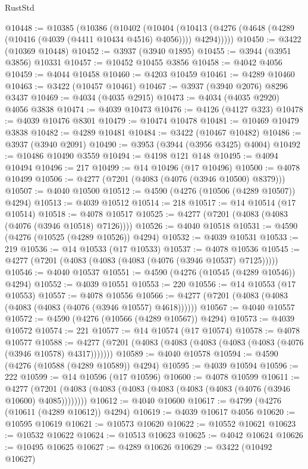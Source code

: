 \begin{lexlean}{RustStd}
\begin{coremodule}
@10448 := @10385
    (@10386
      (@10402
        (@10404
          (@10413 (@4276 (@4648 (@4289 (@10416 (@4039 (@4411 @10434 @4516) @4056)))) @4294)))))
@10450 := @3422 (@10369 @10448)
@10452 := @3937 (@3940 @1895)
@10455 := @3944 (@3951 @3856) @10331
@10457 := @10452 @10455 @3856
@10458 := @4042 @4056
@10459 := @4044 @10458
@10460 := @4203 @10459
@10461 := @4289 @10460
@10463 := @3422 (@10457 @10461)
@10467 := @3937 (@3940 @2076) @8296 @3437
@10469 := @4034 (@4035 @2915)
@10473 := @4034 (@4035 @2920) @4056 @3838
@10474 := @4039 @10473
@10476 := @4126 (@4127 @323)
@10478 := @4039 @10476 @8301
@10479 := @10474 @10478
@10481 := @10469 @10479 @3838
@10482 := @4289 @10481
@10484 := @3422 (@10467 @10482)
@10486 := @3937 (@3940 @2091)
@10490 := @3953 (@3944 (@3956 @3425) @4004)
@10492 := @10486 @10490 @3559
@10494 := @4198 @121 @148
@10495 := @4094 @10494
@10496 := 217
@10499 := @14 @10496 (@17 @10496)
@10500 := @4078 @10499
@10506 := @4277 (@7201 (@4083 (@4076 (@3946 @10500) @8379)))
@10507 := @4040 @10500
@10512 := @4590 (@4276 (@10506 (@4289 @10507)) @4294)
@10513 := @4039 @10512
@10514 := 218
@10517 := @14 @10514 (@17 @10514)
@10518 := @4078 @10517
@10525 := @4277 (@7201 (@4083 (@4083 (@4076 (@3946 @10518) @7126))))
@10526 := @4040 @10518
@10531 := @4590 (@4276 (@10525 (@4289 @10526)) @4294)
@10532 := @4039 @10531
@10533 := 219
@10536 := @14 @10533 (@17 @10533)
@10537 := @4078 @10536
@10545 := @4277 (@7201 (@4083 (@4083 (@4083 (@4076 (@3946 @10537) @7125)))))
@10546 := @4040 @10537
@10551 := @4590 (@4276 (@10545 (@4289 @10546)) @4294)
@10552 := @4039 @10551
@10553 := 220
@10556 := @14 @10553 (@17 @10553)
@10557 := @4078 @10556
@10566 := @4277 (@7201 (@4083 (@4083 (@4083 (@4083 (@4076 (@3946 @10557) @4618))))))
@10567 := @4040 @10557
@10572 := @4590 (@4276 (@10566 (@4289 @10567)) @4294)
@10573 := @4039 @10572
@10574 := 221
@10577 := @14 @10574 (@17 @10574)
@10578 := @4078 @10577
@10588 := @4277 (@7201 (@4083 (@4083 (@4083 (@4083 (@4083 (@4076 (@3946 @10578) @4317)))))))
@10589 := @4040 @10578
@10594 := @4590 (@4276 (@10588 (@4289 @10589)) @4294)
@10595 := @4039 @10594
@10596 := 222
@10599 := @14 @10596 (@17 @10596)
@10600 := @4078 @10599
@10611 := @4277 (@7201 (@4083 (@4083 (@4083 (@4083 (@4083 (@4083 (@4076 (@3946 @10600) @4085))))))))
@10612 := @4040 @10600
@10617 := @4799 (@4276 (@10611 (@4289 @10612)) @4294)
@10619 := @4039 @10617 @4056
@10620 := @10595 @10619
@10621 := @10573 @10620
@10622 := @10552 @10621
@10623 := @10532 @10622
@10624 := @10513 @10623
@10625 := @4042 @10624
@10626 := @10495 @10625
@10627 := @4289 @10626
@10629 := @3422 (@10492 @10627)

\end{coremodule}
\end{lexlean}
